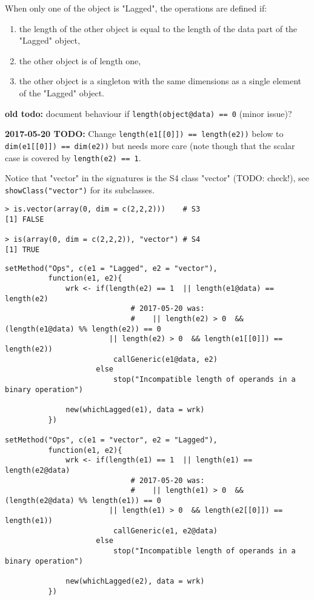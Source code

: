 \documentclass[11pt,a4paper]{article}
\begin{document}
When only one of the object is "Lagged", the operations are defined if:
\begin{enumerate}
\item the length of the other object is equal to the length of the data part of the "Lagged"
object,
\item the other object is of length one,
\item the other object is a singleton with the same dimensions as a single element of the
"Lagged" object.
\end{enumerate}

\textbf{old todo:} document behaviour if \texttt{length(object@data) == 0} (minor issue)?

\textbf{2017-05-20 TODO:} Change \texttt{length(e1[[0]]) == length(e2))} below to
                   \texttt{dim(e1[[0]]) == dim(e2))} but needs more care (note though that the
                   scalar case is covered by \texttt{length(e2) == 1}.

Notice that "vector" in the signatures is the S4 class "vector" (TODO: check!), see
\texttt{showClass("vector")} for its subclasses.
\begin{verbatim}
> is.vector(array(0, dim = c(2,2,2)))    # S3
[1] FALSE

> is(array(0, dim = c(2,2,2)), "vector") # S4
[1] TRUE
\end{verbatim}


\begin{verbatim}
setMethod("Ops", c(e1 = "Lagged", e2 = "vector"),
          function(e1, e2){
              wrk <- if(length(e2) == 1  || length(e1@data) == length(e2)
                             # 2017-05-20 was:
                             #    || length(e2) > 0  && (length(e1@data) %% length(e2)) == 0
                        || length(e2) > 0  && length(e1[[0]]) == length(e2))
                         callGeneric(e1@data, e2)
                     else
                         stop("Incompatible length of operands in a binary operation")

              new(whichLagged(e1), data = wrk)
          })

setMethod("Ops", c(e1 = "vector", e2 = "Lagged"),
          function(e1, e2){
              wrk <- if(length(e1) == 1  || length(e1) == length(e2@data)
                             # 2017-05-20 was:
                             #    || length(e1) > 0  && (length(e2@data) %% length(e1)) == 0
                        || length(e1) > 0  && length(e2[[0]]) == length(e1))
                         callGeneric(e1, e2@data)
                     else
                         stop("Incompatible length of operands in a binary operation")

              new(whichLagged(e2), data = wrk)
          })
\end{verbatim}
\end{document}

